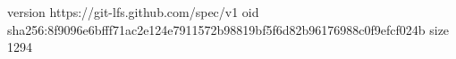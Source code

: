 version https://git-lfs.github.com/spec/v1
oid sha256:8f9096e6bfff71ac2e124e7911572b98819bf5f6d82b96176988c0f9efcf024b
size 1294
